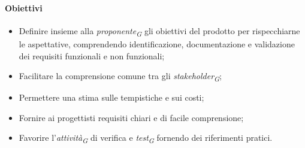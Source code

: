 \paragraph{Obiettivi}
\begin{itemize}
    \item Definire insieme alla \textit{proponente}\textsubscript{\textit{G}} gli obiettivi del prodotto per rispecchiarne le aspettative, comprendendo identificazione, documentazione e validazione dei requisiti funzionali e non funzionali;
    \item Facilitare la comprensione comune tra gli \textit{stakeholder}\textsubscript{\textit{G}};
    \item Permettere una stima sulle tempistiche e sui costi;
    \item Fornire ai progettisti requisiti chiari e di facile comprensione;
    \item Favorire l'\textit{attività}\textsubscript{\textit{G}} di verifica e \textit{test}\textsubscript{\textit{G}} fornendo dei riferimenti pratici.
\end{itemize}


